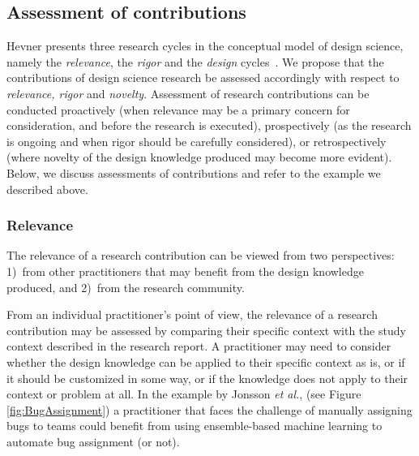 \documentclass[graybox]{svmult}
\newcommand{\peggy}[1]{\textcolor{blue}{{\it [Peggy says: #1]}}}
\newcommand{\peggy}[1]{}
\begin{document}
\subsection{Assessment of contributions}
\label{sec:assessment}

Hevner presents three research cycles in the conceptual model of design science, namely the \emph{relevance}, the \emph{rigor} and the \emph{design} cycles~\cite{Hevner2007}. We propose that the contributions of design science research be assessed accordingly with respect to \emph{relevance, rigor} and \emph{novelty}. 
Assessment of research contributions can be conducted proactively (when relevance may be a primary concern for consideration, and before the research is executed), prospectively (as the research is ongoing and when rigor should be carefully considered), or retrospectively (where novelty of the design knowledge produced may become more evident).
Below, we discuss assessments of contributions and refer to the example we described above.




\subsubsection{Relevance} 

The relevance of a research contribution can be viewed from two perspectives: 1)~from other practitioners that may benefit from the design knowledge produced, and 2)~from the research community. 

From an individual practitioner's point of view, the relevance of a research contribution may be assessed by comparing their specific context with the study context described in the research report. 
A practitioner may need to consider whether the design knowledge can be applied to their specific context as is, or if it should be customized in some way, or if the knowledge does not apply to their context or problem at all.
In the example by Jonsson \emph{et al.}, (see Figure \ref{fig:BugAssignment}) a practitioner that faces the challenge of manually assigning bugs to teams could benefit from using ensemble-based machine learning to automate bug assignment (or not). 
\end{document}
